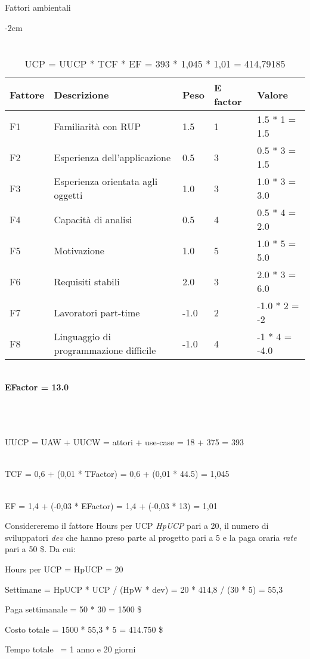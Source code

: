 \begin{table}[hb]
\caption{Fattori ambientali}
    \centering
        \addtolength{\leftskip} {-2cm}
\begin{tabular}{ |P{2.5cm}|P{5cm}|P{2.5cm}|P{2.5cm}|P{2.5cm}|  }
\hline
\textbf{Fattore} & \textbf{Descrizione} & \textbf{Peso} & \textbf{E factor} & \textbf{Valore} \\\hline
F1 & Familiarità con RUP & 1.5 & 1 & 1.5 * 1 = 1.5\\\hline
F2 & Esperienza dell'applicazione & 0.5& 3& 0.5 * 3 = 1.5\\\hline
F3 & Esperienza orientata agli oggetti & 1.0& 3& 1.0 * 3 = 3.0\\\hline
F4 & Capacità di analisi  & 0.5& 4& 0.5 * 4 = 2.0\\\hline
F5 & Motivazione & 1.0& 5& 1.0 * 5 = 5.0\\\hline
F6 & Requisiti stabili & 2.0& 3& 2.0 * 3 = 6.0\\\hline
F7 & Lavoratori part-time & -1.0& 2& -1.0 * 2 = -2\\\hline
F8 & Linguaggio di programmazione difficile & -1.0& 4& -1 * 4 = -4.0\\\hline
\end{tabular}
\caption*{\\\textbf{EFactor = 13.0}\\~\\}
\caption*{\\~\\\large{UUCP = UAW + UUCW = attori + use-case = 18 + 375 = 393}}
\caption*{\\\large{TCF = 0,6 + (0,01 * TFactor) = 0,6 + (0,01 * 44.5) = 1,045}}
\caption*{\\\large{EF = 1,4 + (-0,03 * EFactor) = 1,4 + (-0,03 * 13) = 1,01}}
\caption*{\\\large{UCP = UUCP * TCF * EF = 393 * 1,045 * 1,01 = 414,79185}}
\end{table}

\clearpage

\noindent Considereremo il fattore Hours per UCP \emph{HpUCP} pari a 20, il numero di sviluppatori \emph{dev} che hanno preso parte al progetto pari a 5 e la paga oraria \emph{rate} pari a 50 \$. Da cui:

\vspace{1.0cm}
\centerline{\large{Hours per UCP = HpUCP = 20}}\vspace{0.5cm}
\centerline{\large{Settimane = HpUCP * UCP / (HpW * dev) = 20 * 414,8 / (30 * 5) = 55,3}}\vspace{0.5cm}
\centerline{\large{Paga settimanale = 50 * 30 = 1500 \$}}\vspace{0.5cm}
\centerline{\large{Costo totale = 1500 * 55,3 * 5 = 414.750 \$}}\vspace{0.5cm}
\centerline{\large{Tempo totale ~= 1 anno e 20 giorni}}\vspace{1.0cm}

